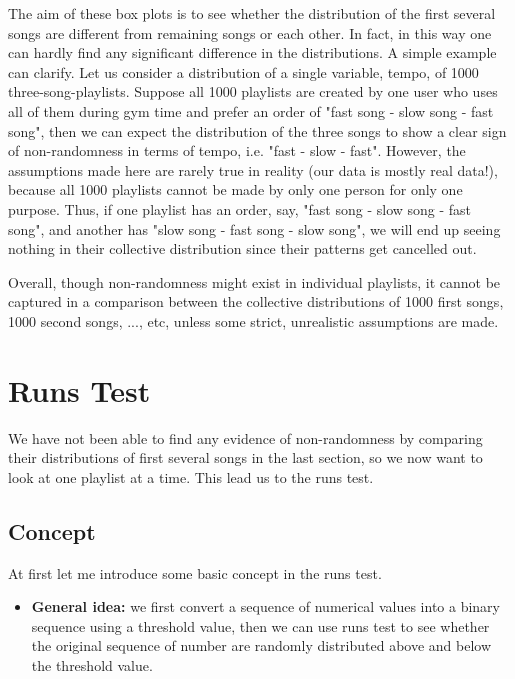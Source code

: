 \documentclass[12pt]{article}
\theoremstyle{plain}
\theoremstyle{definition}
\theoremstyle{remark}
\begin{document}
The aim of these box plots is to see whether the distribution of the first several songs are different from remaining songs or each other. In fact, in this way one can hardly find any significant difference in the distributions. A simple example can clarify. Let us consider a distribution of a single variable, tempo, of 1000 three-song-playlists. Suppose all 1000 playlists are created by one user who uses all of them during gym time and prefer an order of "fast song - slow song - fast song", then we can expect the distribution of the three songs to show a clear sign of non-randomness in terms of tempo, i.e. "fast - slow - fast". However, the assumptions made here are rarely true in reality (our data is mostly real data!), because all 1000 playlists cannot be made by only one person for only one purpose. Thus, if one playlist has an order, say, "fast song - slow song - fast song", and another has "slow song - fast song - slow song", we will end up seeing nothing in their collective distribution since their patterns get cancelled out. 

Overall, though non-randomness might exist in individual playlists, it cannot be captured in a comparison between the collective distributions of 1000 first songs, 1000 second songs, ..., etc, unless some strict, unrealistic assumptions are made. 

\newpage


\section{Runs Test}
We have not been able to find any evidence of non-randomness by comparing their distributions of first several songs in the last section, so we now want to look at one playlist at a time. This lead us to the runs test\cite{3.5}.

\subsection{Concept}
 At first let me introduce some basic concept in the runs test.

\begin{itemize}
    \item \textbf{General idea:} we first convert a sequence of numerical values into a binary sequence using a threshold value, then we can use runs test to see whether the original sequence of number are randomly distributed above and below the threshold value.
\end{itemize}
\end{document}
